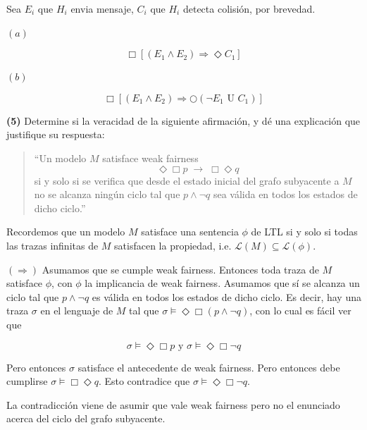 \documentclass[a4paper, 12pt]{article}
\begin{document}
Sea $E_i$ que $H_i$ envia mensaje, $C_i$ que $H_i$ detecta colisión, por
brevedad.

$(a)$

\begin{equation*}
    \Box \left[ (E_1 \land E_2) \Rightarrow \Diamond C_1 \right] 
\end{equation*}

$(b)$

\begin{equation*}
    \Box \left[ (E_1 \land E_2) \Rightarrow \bigcirc (\neg  E_1 \text{ U } C_1 )\right] 
\end{equation*}

\pagebreak 

\begin{myframe}
    \textbf{(5)}
Determine si la veracidad de la siguiente afirmación, y dé una explicación
que justifique su respuesta:

\begin{quote}
``Un modelo $M$ satisface weak fairness
\[
    \Diamond \Box p \;\rightarrow\; \Box \Diamond q
\]
si y solo si se verifica que desde el estado inicial del grafo subyacente a
$M$ no se alcanza ningún ciclo tal que $p \land \neg q$ sea válida en todos
los estados de dicho ciclo.''
\end{quote}
\end{myframe}

Recordemos que un modelo $M$ satisface una sentencia $\phi$ de LTL si y solo si 
todas las trazas infinitas de $M$ satisfacen la propiedad, i.e. 
$\mathcal{L}(M) \subseteq \mathcal{L}(\phi)$.

$(\Rightarrow)$ Asumamos que se cumple weak fairness. Entonces toda traza de $M$
satisface $\phi$, con $\phi$ la implicancia de weak fairness. Asumamos que sí
se alcanza un ciclo tal que $p \land  \neg q$ es válida en todos los estados de
dicho ciclo. Es decir, hay una traza $\sigma$ en el lenguaje de $M$ tal que 
$\sigma \vDash \Diamond \Box (p \land  \neg q)$, con lo cual es fácil ver que

\begin{equation*}
    \sigma \vDash \Diamond \Box p \text{  y  } \sigma \vDash \Diamond \Box \neg q
\end{equation*}

Pero entonces $\sigma$ satisface el antecedente de weak fairness. Pero entonces
debe cumplirse $\sigma \vDash \Box \Diamond q$. Esto contradice que
$\sigma \vDash \Diamond \Box \neg q$.

La contradicción viene de asumir que vale weak fairness pero no el enunciado
acerca del ciclo del grafo subyacente.
\end{document}
